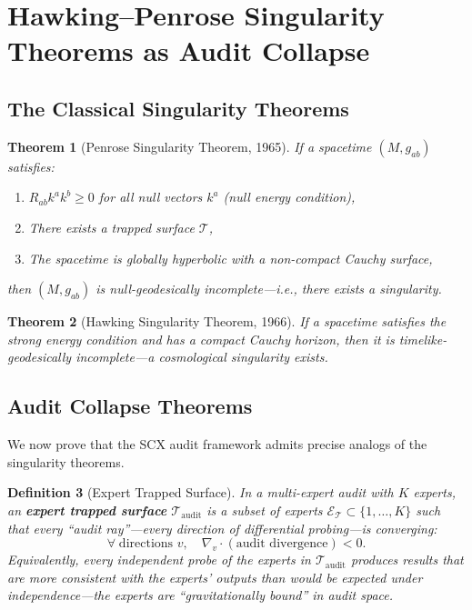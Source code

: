 \documentclass[12pt,a4paper]{article}
\newtheorem{theorem}{Theorem}[section]
\newtheorem{definition}[theorem]{Definition}
\theoremstyle{remark}
\newcommand{\SCX}{\textsf{SCX}}
\begin{document}
\section{Hawking--Penrose Singularity Theorems as Audit Collapse}
\label{sec:singularity}

\subsection{The Classical Singularity Theorems}

\begin{theorem}[Penrose Singularity Theorem, 1965]
\label{thm:penrose}
If a spacetime $(M, g_{ab})$ satisfies:
\begin{enumerate}[leftmargin=*, label=(\roman*)]
  \item $R_{ab} k^a k^b \geq 0$ for all null vectors $k^a$ (null energy condition),
  \item There exists a trapped surface $\mathcal{T}$,
  \item The spacetime is globally hyperbolic with a non-compact Cauchy surface,
\end{enumerate}
then $(M, g_{ab})$ is null-geodesically incomplete---i.e., there exists a singularity.
\end{theorem}

\begin{theorem}[Hawking Singularity Theorem, 1966]
\label{thm:hawking_singularity}
If a spacetime satisfies the strong energy condition and has a compact Cauchy horizon, then it is timelike-geodesically incomplete---a cosmological singularity exists.
\end{theorem}

\subsection{Audit Collapse Theorems}

We now prove that the \SCX{} audit framework admits precise analogs of the singularity theorems.

\begin{definition}[Expert Trapped Surface]
\label{def:trapped_surface}
In a multi-expert audit with $K$ experts, an \textbf{expert trapped surface} $\mathcal{T}_{\text{audit}}$ is a subset of experts $\mathcal{E}_{\mathcal{T}} \subset \{1, \ldots, K\}$ such that every ``audit ray''---every direction of differential probing---is converging:
\begin{equation}
  \forall\; \text{directions } v,\quad \nabla_v \cdot (\text{audit divergence}) < 0.
\end{equation}
Equivalently, every independent probe of the experts in $\mathcal{T}_{\text{audit}}$ produces results that are \emph{more consistent} with the experts' outputs than would be expected under independence---the experts are ``gravitationally bound'' in audit space.
\end{definition}
\end{document}
